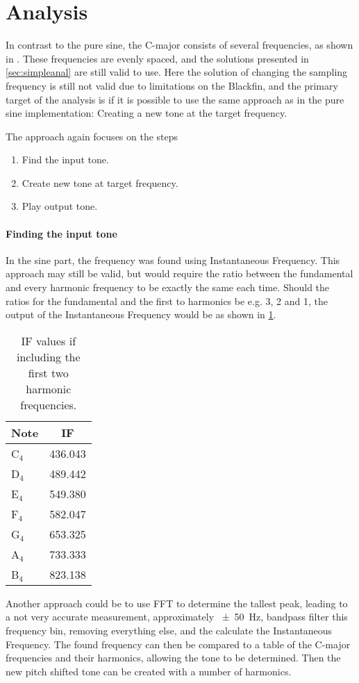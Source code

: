 
\section{Analysis}
In contrast to the pure sine, the C-major consists of several frequencies, as shown in .
These frequencies are evenly spaced, and the solutions presented in \cref{sec:simpleanal} are still valid to use.
Here the solution of changing the sampling frequency is still not valid due to limitations on the Blackfin, and the primary target of the analysis is if it is possible to use the same approach as in the pure sine implementation: Creating a new tone at the target frequency.

The approach again focuses on the steps
\begin{enumerate}
	\item Find the input tone.
	\item Create new tone at target frequency.
	\item Play output tone.
\end{enumerate}

\paragraph{Finding the input tone}
In the sine part, the frequency was found using Instantaneous Frequency.
This approach may still be valid, but would require the ratio between the fundamental and every harmonic frequency to be exactly the same each time.
Should the ratios for the fundamental and the first to harmonics be e.g. 3, 2 and 1, the output of the Instantaneous Frequency would be as shown in \cref{tab:CmajorIF}.

\begin{table}
	\centering
	\begin{tabular}{l c}
		\toprule
		Note & IF \\
		\midrule
		C$_4$ & \num{436.043} \\
		D$_4$ & \num{489.442} \\
		E$_4$ & \num{549.380} \\
		F$_4$ & \num{582.047} \\
		G$_4$ & \num{653.325} \\
		A$_4$ & \num{733.333} \\
		B$_4$ & \num{823.138} \\
		\bottomrule
	\end{tabular}
	\caption{IF values if including the first two harmonic frequencies.}
	\label{tab:CmajorIF}
\end{table}

Another approach could be to use FFT to determine the tallest peak, leading to a not very accurate measurement, approximately \SI{\pm50}{\hertz}, bandpass filter this frequency bin, removing everything else, and the calculate the Instantaneous Frequency.
The found frequency can then be compared to a table of the C-major frequencies and their harmonics, allowing the tone to be determined.
Then the new pitch shifted tone can be created with a number of harmonics.